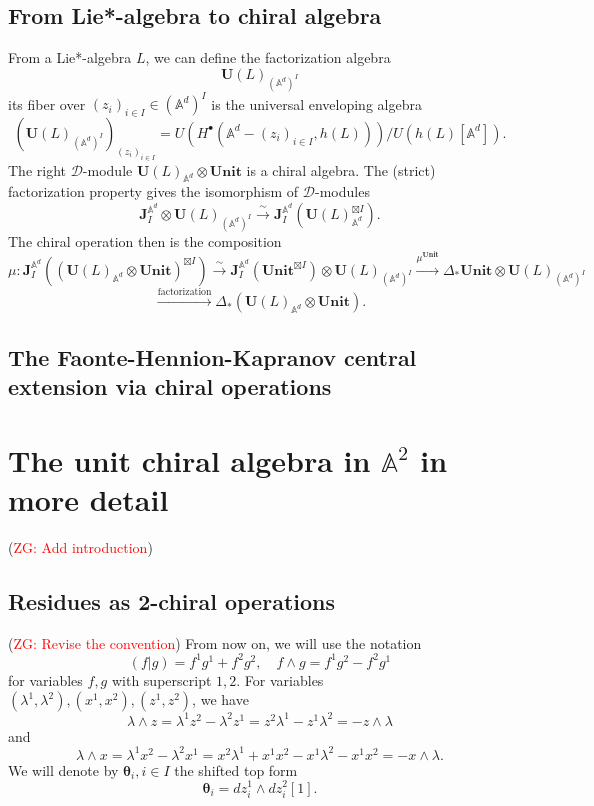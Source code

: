 \documentclass[11pt]{amsart}
\theoremstyle{definition}
\theoremstyle{remark}
\numberwithin{equation}{section}
\newcommand{\Gui}[1]{(\textcolor{red}{ZG: #1})}
\begin{document}
\subsection{From Lie*-algebra to chiral algebra}
From a Lie*-algebra $L$, we can define the factorization algebra
$$
\mathbf{U}(L)_{(\mathbb{A}^d)^{ I}}
$$
its fiber over $(z_i)_{i\in I}\in (\mathbb{A}^d)^{ I}$ is the universal enveloping algebra
$$
\left(\mathbf{U}(L)_{(\mathbb{A}^d)^{ I}}\right)_{(z_i)_{i\in I}}=U\left(H^{\bullet}(\mathbb{A}^d-(z_i)_{i\in I},h(L))\right)/U\left(h(L)[\mathbb{A}^d]\right).
$$
The right $\mathcal{D}$-module $\mathbf{U}(L)_{\mathbb{A}^d}\otimes \mathbf{Unit}$ is a chiral algebra. The (strict) factorization property gives the isomorphism of $\mathcal{D}$-modules
$$ \mathbf{J}^{\mathbb{A}^d}_{ I}\otimes \mathbf{U}(L)_{(\mathbb{A}^d)^{ I}}\xrightarrow{\sim}\mathbf{J}^{\mathbb{A}^d}_{ I}\left(\mathbf{U}(L)_{\mathbb{A}^d}^{\boxtimes I}\right).
$$
The chiral operation then is the composition
$$
\mu:\mathbf{J}^{\mathbb{A}^d}_{ I}\left((\mathbf{U}(L)_{\mathbb{A}^d}\otimes \mathbf{Unit})^{\boxtimes I}\right)\xrightarrow{\sim} \mathbf{J}^{\mathbb{A}^d}_{ I}(\mathbf{Unit}^{\boxtimes I})\otimes \mathbf{U}(L)_{(\mathbb{A}^d)^{ I}}\xrightarrow{\mu^{\mathbf{Unit}}}\Delta_*\mathbf{Unit}\otimes \mathbf{U}(L)_{(\mathbb{A}^d)^{ I}}
$$
$$
\xrightarrow{\text{factorization}}\Delta_*\left(\mathbf{U}(L)_{\mathbb{A}^d}\otimes \mathbf{Unit}\right).
$$
\subsection{The Faonte-Hennion-Kapranov central extension via chiral operations}


\section{The unit chiral algebra in $\mathbb{A}^2$ in more detail}
\Gui{Add introduction}
\subsection{Residues as 2-chiral operations}
\Gui{Revise the convention}
From now on, we will use the notation
$$
(f|g)=f^1g^1+f^2g^2,\quad f\wedge g=f^1g^2-f^2g^1
$$
for variables $f,g$ with superscript $1,2$. For variables $(\lambda^1,\lambda^2), (x^1,x^2), (z^1,z^2)$, we have
$$
\lambda\wedge z=\lambda^1z^2-\lambda^2z^1=z^2\lambda^1-z^1\lambda^2=-z\wedge\lambda
$$
and
$$
\lambda\wedge x=\lambda^1x^2-\lambda^2x^1=x^2\lambda^1+x^1x^2-x^1\lambda^2-x^1x^2=-x\wedge\lambda.
$$
We will denote by $\boldsymbol{\theta}_i,i\in  I$ the shifted top form
$$
\boldsymbol{\theta}_i=dz_i^1\wedge dz^2_i[1].
$$
\end{document}
